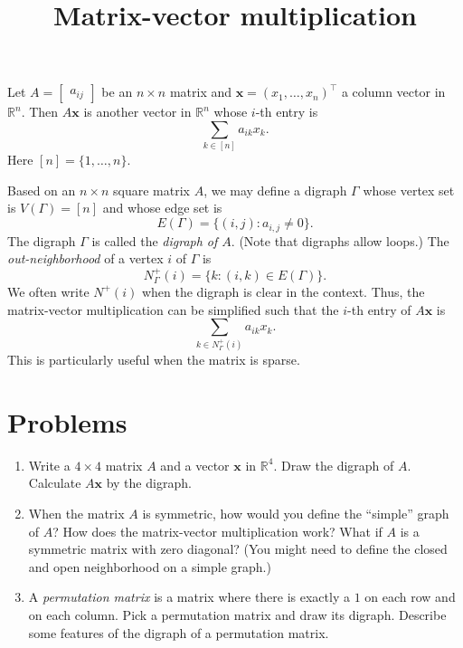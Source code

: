 \documentclass{article}
\title{Matrix-vector multiplication}
\date{\vspace{-1cm}}
\newcommand{\trans}{^\top}
\newcommand{\bx}{\mathbf{x}}
\theoremstyle{definition}
\begin{document}
\maketitle
\large

Let $A = \begin{bmatrix} a_{ij}\end{bmatrix}$ be an $n\times n$ matrix and $\bx = (x_1,\ldots, x_n)\trans$ a column vector in $\mathbb{R}^n$.  Then $A\bx$ is another vector in $\mathbb{R}^n$ whose $i$-th entry is 
\[\sum_{k\in[n]}a_{ik}x_k.\]
Here $[n] = \{1,\ldots, n\}$.  

Based on an $n\times n$ square matrix $A$, we may define a digraph $\Gamma$ whose vertex set is $V(\Gamma) = [n]$ and whose edge set is 
\[E(\Gamma) = \{(i,j) : a_{i,j}\neq 0\}.\]
The digraph $\Gamma$ is called the \emph{digraph of $A$}.  (Note that digraphs allow loops.)  The \emph{out-neighborhood} of a vertex $i$ of $\Gamma$ is 
\[N^+_\Gamma(i) = \{k : (i,k) \in E(\Gamma)\}.\]
We often write $N^+(i)$ when the digraph is clear in the context.
Thus, the matrix-vector multiplication can be simplified such that the $i$-th entry of $A\bx$ is 
\[\sum_{k\in N^+_\Gamma(i)}a_{ik}x_k.\]
This is particularly useful when the matrix is sparse.

\section*{Problems}
\begin{enumerate}
\setlength\itemsep{2em}
\item Write a $4\times 4$ matrix $A$ and a vector $\bx$ in $\mathbb{R}^4$.  Draw the digraph of $A$.  Calculate $A\bx$ by the digraph.
\item When the matrix $A$ is symmetric, how would you define the ``simple'' graph of $A$?  How does the matrix-vector multiplication work?  What if $A$ is a symmetric matrix with zero diagonal?  (You might need to define the closed and open neighborhood on a simple graph.)
\item A \emph{permutation matrix} is a matrix where there is exactly a $1$ on each row and on each column.  Pick a permutation matrix and draw its digraph.  Describe some features of the digraph of a permutation matrix.
\end{enumerate}

\end{document}
